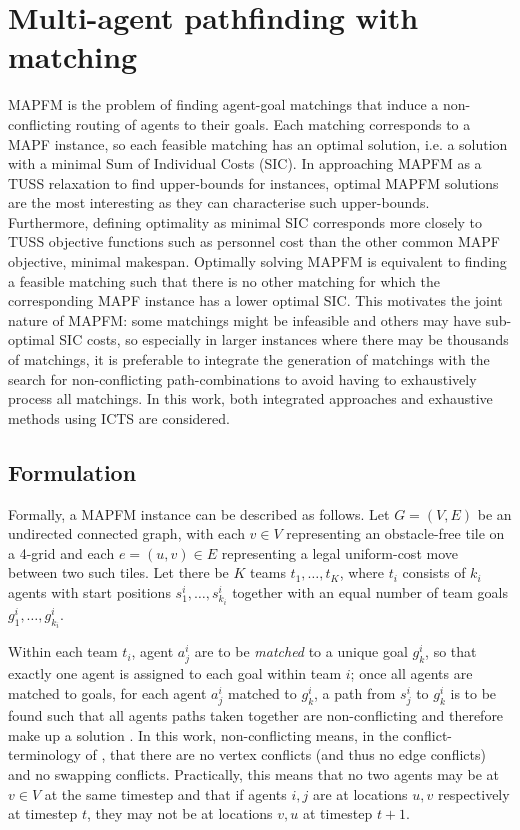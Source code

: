 \documentclass[english]{article}
\begin{document}
	\section{Multi-agent pathfinding with matching} %
	MAPFM is the problem of finding agent-goal matchings that induce a non-conflicting routing of agents to their goals. Each matching corresponds to a MAPF instance, so each feasible matching has an optimal solution, i.e. a solution with a minimal Sum of Individual Costs (SIC). In approaching MAPFM as a TUSS relaxation to find upper-bounds for instances, optimal MAPFM solutions are the most interesting as they can characterise such upper-bounds. Furthermore, defining optimality as minimal SIC corresponds more closely to TUSS objective functions such as personnel cost than the other common MAPF objective, minimal makespan. Optimally solving MAPFM is equivalent to finding a feasible matching such that there is no other matching for which the corresponding MAPF instance has a lower optimal SIC. This motivates the joint nature of MAPFM: some matchings might be infeasible and others may have sub-optimal SIC costs, so especially in larger instances where there may be thousands of matchings, it is preferable to integrate the generation of matchings with the search for non-conflicting path-combinations to avoid having to exhaustively process all matchings. In this work, both integrated approaches and exhaustive methods using ICTS are considered.
	
	\subsection{Formulation}
	Formally, a MAPFM instance can be described as follows. Let $G = (V,E)$ be an undirected connected graph, with each $v\in V$ representing an obstacle-free tile on a 4-grid and each $e = (u,v)\in E$ representing a legal uniform-cost move between two such tiles. Let there be $K$ teams $t_1,\ldots, t_K$, where $t_i$ consists of $k_i$ agents with start positions $s_1^i,\ldots,s_{k_i}^i$ together with an equal number of team goals $g_1^i,\ldots,g_{k_i}^i$. 
	
	Within each team $t_i$, agent $a_j^i$ are to be \textit{matched} to a unique goal $g_k^i$, so that exactly one agent is assigned to each goal within team $i$; once all agents are matched to goals, for each agent $a_j^i$ matched to $g_k^i$, a path from $s_j^i$ to $g_k^i$ is to be found such that all agents paths taken together are non-conflicting and therefore make up a solution \cite{ma2016}. In this work, non-conflicting means, in the conflict-terminology of \cite{stern2019}, that there are no vertex conflicts (and thus no edge conflicts) and no swapping conflicts. Practically, this means that no two agents may be at $v\in V$ at the same timestep and that if agents $i,j$ are at locations $u,v$ respectively at timestep $t$, they may not be at locations $v,u$ at timestep $t+1$. 
\end{document}
